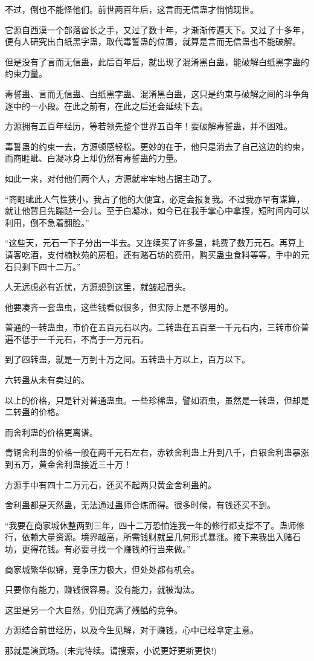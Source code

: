 \begin{this_body}
不过，倒也不能怪他们。前世两百年后，这言而无信蛊才悄悄现世。

它源自西漠一个部落酋长之手，又过了数十年，才渐渐传遍天下。又过了十多年，便有人研究出白纸黑字蛊，取代毒誓蛊的位置，就算是言而无信蛊也不能破解。

但是没有了言而无信蛊，此后百年后，就出现了混淆黑白蛊，能破解白纸黑字蛊的约束力量。

毒誓蛊、言而无信蛊、白纸黑字蛊、混淆黑白蛊，这只是约束与破解之间的斗争角逐中的一小段。在此之前有，在此之后还会延续下去。

方源拥有五百年经历，等若领先整个世界五百年！要破解毒誓蛊，并不困难。

毒誓蛊的约束一去，方源顿感轻松。更妙的在于，他只是消去了自己这边的约束，而商睚眦、白凝冰身上却仍然有毒誓蛊的力量。

如此一来，对付他们两个人，方源就牢牢地占据主动了。

“商睚眦此人气性狭小，我占了他的大便宜，必定会报复我。不过我亦早有谋算，就让他暂且先蹦跶一会儿。至于白凝冰，如今已在我手掌心中拿捏，短时间内可以利用，倒不急着翻脸。”

“这些天，元石一下子分出一半去。又连续买了许多蛊，耗费了数万元石。再算上请客吃酒，支付楠秋苑的房租，还有赌石坊的费用，购买蛊虫食料等等，手中的元石只剩下四十二万。”

人无远虑必有近忧，方源想到这里，就皱起眉头。

他要凑齐一套蛊虫，这些钱看似很多，但实际上是不够用的。

普通的一转蛊虫，市价在五百元石以内。二转蛊在五百至一千元石内，三转市价普遍不低于一千元石，不高于一万元石。

到了四转蛊，就是一万到十万之间。五转蛊十万以上，百万以下。

六转蛊从未有卖过的。

以上的价格，只是针对普通蛊虫。一些珍稀蛊，譬如酒虫，虽然是一转蛊，但却是二转蛊的价格。

而舍利蛊的价格更离谱。

青铜舍利蛊的价格一般在两千元石左右，赤铁舍利蛊上升到八千，白银舍利蛊暴涨到五万，黄金舍利蛊接近三十万！

方源手中有四十二万元石，还买不起两只黄金舍利蛊的。

舍利蛊都是天然蛊，无法通过蛊师合炼而得。很多时候，有钱还买不到。

“我要在商家城休整两到三年，四十二万恐怕连我一年的修行都支撑不了。蛊师修行，依赖大量资源。境界越高，所需钱财就呈几何形式暴涨。接下来我出入赌石坊，更得花钱。有必要寻找一个赚钱的行当来做。”

商家城繁华似锦，竞争压力极大，但处处都有机会。

只要你有能力，赚钱很容易。没有能力，就被淘汰。

这里是另一个大自然，仍旧充满了残酷的竞争。

方源结合前世经历，以及今生见解，对于赚钱，心中已经拿定主意。

那就是演武场。(未完待续。请搜索，小说更好更新更快!)

\end{this_body}

